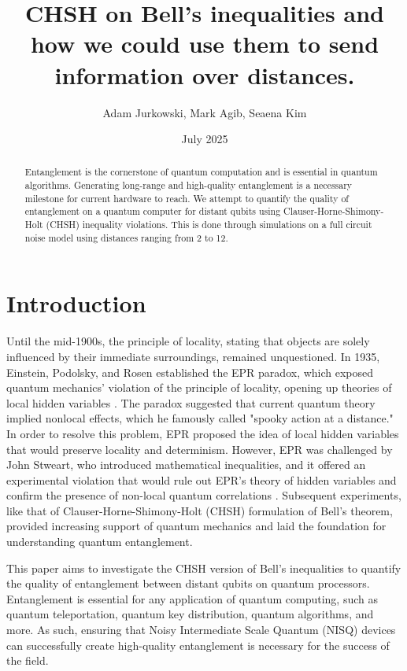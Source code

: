 \documentclass{article}
\title{CHSH on Bell’s inequalities and how we could use them to send information over distances.}
\author{Adam Jurkowski, Mark Agib, Seaena Kim}
\date{July 2025}
\begin{document}
\maketitle

\begin{abstract}
    Entanglement is the cornerstone of quantum computation and is essential in quantum algorithms. Generating long-range and high-quality entanglement is a necessary milestone for current hardware to reach. We attempt to quantify the quality of entanglement on a quantum computer for distant qubits using Clauser-Horne-Shimony-Holt (CHSH) inequality violations. This is done through simulations on a full circuit noise model using distances ranging from 2 to 12.
\end{abstract}



\section{Introduction}
Until the mid-1900s, the principle of locality, stating that objects are solely influenced by their immediate surroundings, remained unquestioned. In 1935, Einstein, Podolsky, and Rosen established the EPR paradox, which exposed quantum mechanics’ violation of the principle of locality, opening up theories of local hidden variables \cite{PhysRev.47.777}. The paradox suggested that current quantum theory implied nonlocal effects, which he famously called "spooky action at a distance." In order to resolve this problem, EPR proposed the idea of local hidden variables that would preserve locality and determinism. However, EPR was challenged by John Stweart, who introduced mathematical inequalities, and it offered an experimental violation that would rule out EPR's theory of hidden variables and confirm the presence of non-local quantum correlations \cite{PhysicsPhysiqueFizika.1.195}. Subsequent experiments, like that of Clauser-Horne-Shimony-Holt (CHSH) formulation of Bell's theorem, provided increasing support of quantum mechanics and laid the foundation for understanding quantum entanglement. 

This paper aims to investigate the CHSH version of Bell's inequalities to quantify the quality of entanglement between distant qubits on quantum processors. Entanglement is essential for any application of quantum computing, such as quantum teleportation, quantum key distribution, quantum algorithms, and more. As such, ensuring that Noisy Intermediate Scale Quantum (NISQ) devices can successfully create high-quality entanglement is necessary for the success of the field. 
\end{document}

